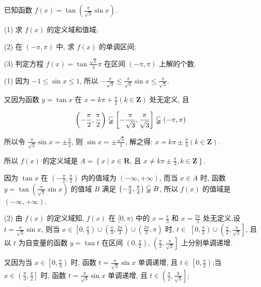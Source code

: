 \begin{example}
	已知函数 $f(x)=\tan \left(\frac{\pi}{\sqrt{3}} \sin x\right)$.

	(1) 求 $f(x)$ 的定义域和值域;

	(2) 在 $(-\pi, \pi)$ 中, 求 $f(x)$ 的单调区间;

	(3) 判定方程 $f(x)=\tan \frac{\sqrt{2}}{3} \pi$ 在区间 $(-\pi, \pi)$ 上解的个数.
\end{example}
\begin{solution}
	(1) 因为 $-1 \leqslant \sin x \leqslant 1$, 所以 $-\frac{\pi}{\sqrt{3}} \leqslant \frac{\pi}{\sqrt{3}} \sin x \leqslant \frac{\pi}{\sqrt{3}}$.

	又因为函数 $y=\tan x$ 在 $x=k \pi+\frac{\pi}{2}(k \in \mathbf{Z})$ 处无定义, 且

	$$
		\left(-\frac{\pi}{2}, \frac{\pi}{2}\right) \varsubsetneqq\left[-\frac{\pi}{\sqrt{3}}, \frac{\pi}{\sqrt{3}}\right] \varsubsetneqq(-\pi, \pi)
	$$

	所以令 $\frac{\pi}{\sqrt{3}} \sin x= \pm \frac{\pi}{2}$, 则 $\sin x= \pm \frac{\sqrt{3}}{2}$, 解之得: $x=k \pi \pm \frac{\pi}{3}(k \in \mathbf{Z})$.

	所以 $f(x)$ 的定义域是 $A=\left\{x \mid x \in \mathbf{R}\right.$, 且 $\left.x \neq k \pi \pm \frac{\pi}{3}, k \in \mathbf{Z}\right\}$.

	因为 $\tan x$ 在 $\left(-\frac{\pi}{2}, \frac{\pi}{2}\right)$ 内的值域为 $(-\infty,+\infty)$, 而当 $x \in A$ 时, 函数 $y=\tan \left(\frac{\pi}{\sqrt{3}} \sin x\right)$ 的值域 $B$ 满足 $\left(-\frac{\pi}{2}, \frac{\pi}{2}\right) \varsubsetneqq B$, 所以 $f(x)$ 的值域是 $(-\infty,+\infty)$.

	(2) 由 $f(x)$ 的定义域知, $f(x)$ 在 $[0, \pi)$ 中的 $x=\frac{\pi}{3}$ 和 $x=\frac{2 \pi}{3}$ 处无定义.设 $t=\frac{\pi}{\sqrt{3}} \sin x$, 则当 $x \in\left[0, \frac{\pi}{3}\right) \cup\left(\frac{\pi}{3}, \frac{2 \pi}{3}\right) \cup\left(\frac{2 \pi}{3}, \pi\right)$ 时, $t \in$ $\left[0, \frac{\pi}{2}\right) \cup\left(\frac{\pi}{2}, \frac{\pi}{\sqrt{3}}\right]$, 且以 $t$ 为自变量的函数 $y=\tan t$ 在区间 $\left(0, \frac{\pi}{2}\right)$, $\left(\frac{\pi}{2}, \frac{\pi}{\sqrt{3}}\right]$ 上分别单调递增.

				又因为当 $x \in\left[0, \frac{\pi}{3}\right)$ 时, 函数 $t=\frac{\pi}{\sqrt{3}} \sin x$ 单调递增, 且 $t \in\left[0, \frac{\pi}{2}\right)$;当 $x \in\left(\frac{\pi}{3}, \frac{\pi}{2}\right]$ 时, 函数 $t=\frac{\pi}{\sqrt{3}} \sin x$ 单调递增, 且 $t \in\left(\frac{\pi}{2}, \frac{\pi}{\sqrt{3}}\right]$;


\end{solution}
